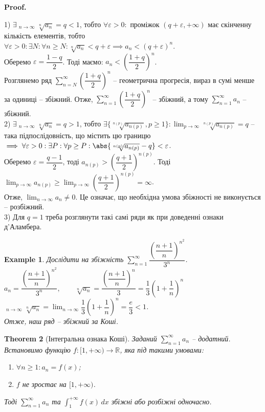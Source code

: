 \documentclass[a4paper, 10pt]{article}
\makeatletter
\DeclareMathOperator*\uplim{\overline{lim}}
\def\huge{\displaystyle}
\theoremstyle{theoremdd}
\newtheorem{theorem}{Theorem}[subsection]
\theoremstyle{theoremdd}
\theoremstyle{theoremdd}
\theoremstyle{theoremdd}
\theoremstyle{theoremdd}
\newtheorem{example}[theorem]{Example}
\theoremstyle{theoremdd}
\theoremstyle{theoremdd}
\theoremstyle{theoremdd}
\theoremstyle{theoremdd}
\renewenvironment{proof}[1][Proof.\\]{\par
\pushQED{\hfill \qed}%
\normalfont \topsep6\p@\@plus6\p@\relax
\trivlist
\item\relax
{\bfseries
#1\@addpunct{.}}\hspace\labelsep\ignorespaces
}{%
\popQED\endtrivlist\@endpefalse
}
\makeatother
\begin{document}
\begin{proof}
1) $\exists \huge \uplim_{n \to \infty} \sqrt[n]{a_n} = q < 1$, тобто $\forall \varepsilon > 0:$ проміжок $(q+\varepsilon,+\infty)$ має скінченну кількість елементів, тобто \\ 
$\forall \varepsilon > 0: \exists N: \forall n \geq N: \sqrt[n]{a_n} < q + \varepsilon \implies a_n < (q + \varepsilon)^n$.\\
Оберемо $\varepsilon = \dfrac{1-q}{2}$. Тоді маємо: $a_n < \left( \dfrac{1+q}{2} \right)^n$.\\
Розглянемо ряд $\huge \sum_{n = N}^{\infty} \left( \dfrac{1+q}{2} \right)^n$ -- геометрична прогресія, вираз в сумі менше за одиниці -- збіжний. Отже, $\huge \sum_{n = 1}^{\infty} \left( \dfrac{1+q}{2} \right)^n$ -- збіжний, а тому $\huge \sum_{n=1}^{\infty} a_n$ -- збіжний.
\bigskip \\
2) $\exists \huge \uplim_{n \to \infty} \sqrt[n]{a_n} = q > 1$, тобто $\exists \{\sqrt[n(p)]{a_{n(p)}}, p \geq 1 \}: \huge \lim_{p \to \infty} \sqrt[n(p)]{a_{n(p)}} = q$ -- така підпослідовність, що містить цю границю $\implies \forall \varepsilon > 0: \exists P: \forall p \geq P: \abs{\sqrt[n(p)]{a_{n(p)}} - q} < \varepsilon$.\\
Оберемо $\varepsilon = \dfrac{q-1}{2}$, тоді $a_{n(p)} > \left( \dfrac{q+1}{2} \right)^{n(p)}$. Тоді $\huge \lim_{p \to \infty} a_{n(p)} \geq \lim_{p \to \infty} \left( \dfrac{q+1}{2} \right)^{n(p)} = \infty$.\\
Отже, $\huge \lim_{n \to \infty} a_n \neq 0$. Це означає, що необхідна умова збіжності не виконується -- розбіжний.
\bigskip \\
3) Для $q=1$ треба розглянути такі самі ряди як при доведенні ознаки д'Аламбера.
\end{proof}

\begin{example}
Дослідити на збіжність $\huge\sum_{n=1}^\infty \dfrac{\left( \dfrac{n+1}{n} \right)^{n^2}}{3^n}$.\\
$a_n = \dfrac{\left( \dfrac{n+1}{n} \right)^{n^2}}{3^n}, \qquad \sqrt[n]{a_n} = \dfrac{\left( \dfrac{n+1}{n} \right)^n}{3} = \dfrac{1}{3} \left( 1 + \dfrac{1}{n} \right)^n$\\
$\huge\uplim_{n \to \infty} \sqrt[n]{a_n} = \lim_{n \to \infty} \dfrac{1}{3} \left( 1 + \dfrac{1}{n} \right)^n = \dfrac{e}{3} < 1$.\\
Отже, наш ряд -- збіжний за Коші.
\end{example}

\begin{theorem}[Інтегральна ознака Коші]
Заданий $\huge \sum_{n=1}^{\infty} a_n$ -- додатний. Встановимо функцію $f \colon [1,+\infty) \to \mathbb{R}$, яка під такими умовами:
\begin{enumerate}[nosep,wide=0pt,label={\arabic*)}]
\item $\forall n \geq 1: a_n = f(x)$;
\item $f$ не зростає на $[1,+\infty)$.
\end{enumerate}
Тоді $\huge \sum_{n = 1}^\infty a_n$ та $\huge \int_1^{+\infty} f(x)\,dx$ збіжні або розбіжні одночасно.
\end{theorem}
\end{document}
